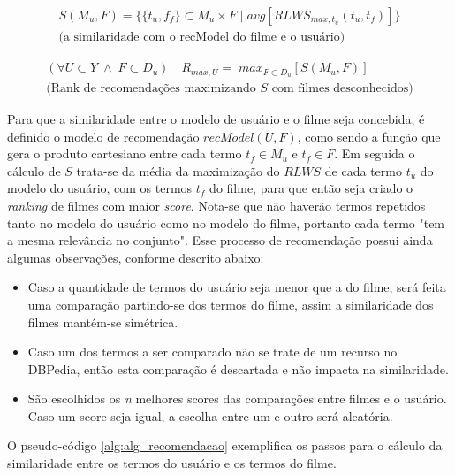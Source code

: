 \begin{equation}
	\begin{aligned}
		S(M_u, F) = \{\{t_u, f_f\} \subset M_u \times F \;|\; avg[RLWS_{max, t_u}(t_u, t_f)]\}\\
		\text{(a similaridade com o recModel do filme e o usuário)}
	\end{aligned}
\label{eq:rec_model_similarity}
\end{equation}

\begin{equation}
	\begin{aligned}
		(\forall U \subset Y\; \land \; F \subset D_u) \quad R_{max, U} = \; max_{F \subset D_u}[S(M_u, F)]\\
		\text{(Rank de recomendações maximizando $S$ com filmes desconhecidos)}
	\end{aligned}
\label{eq:rec_model_max}
\end{equation}

Para que a similaridade entre o modelo de usuário e o filme seja concebida, é definido o modelo de recomendação $recModel(U, F)$, como sendo a função que gera o produto cartesiano entre cada termo $t_f \in M_u$ e $t_f \in F$. Em seguida o cálculo de $S$ trata-se da média da maximização do $RLWS$ de cada termo $t_u$ do modelo do usuário, com os termos $t_f$ do filme, para que então seja criado o \textit{ranking} de filmes com maior \textit{score}. Nota-se que não haverão termos repetidos tanto no modelo do usuário como no modelo do filme, portanto cada termo "tem a mesma relevância no conjunto". Esse processo de recomendação possui ainda algumas observações, conforme descrito abaixo:

\begin{itemize}
	\item{Caso a quantidade de termos do usuário seja menor que a do filme, será feita uma comparação partindo-se dos termos do filme, assim a similaridade dos filmes mantém-se simétrica.}
	\item{Caso um dos termos a ser comparado não se trate de um recurso no DBPedia, então esta comparação é descartada e não impacta na similaridade.}
	\item{São escolhidos os \textit{n} melhores scores das comparações entre filmes e o usuário. Caso um score seja igual, a escolha entre um e outro será aleatória.}
\end{itemize}

O pseudo-código \ref{alg:alg_recomendacao} exemplifica os passos para o cálculo da similaridade entre os termos do usuário e os termos do filme.

